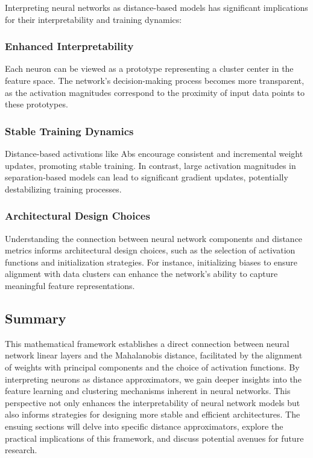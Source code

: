 Interpreting neural networks as distance-based models has significant implications for their interpretability and training dynamics:

\subsubsection{Enhanced Interpretability}

Each neuron can be viewed as a prototype representing a cluster center in the feature space. The network's decision-making process becomes more transparent, as the activation magnitudes correspond to the proximity of input data points to these prototypes.

\subsubsection{Stable Training Dynamics}

Distance-based activations like Abs encourage consistent and incremental weight updates, promoting stable training. In contrast, large activation magnitudes in separation-based models can lead to significant gradient updates, potentially destabilizing training processes.

\subsubsection{Architectural Design Choices}

Understanding the connection between neural network components and distance metrics informs architectural design choices, such as the selection of activation functions and initialization strategies. For instance, initializing biases to ensure alignment with data clusters can enhance the network's ability to capture meaningful feature representations.

\subsection{Summary}

This mathematical framework establishes a direct connection between neural network linear layers and the Mahalanobis distance, facilitated by the alignment of weights with principal components and the choice of activation functions. By interpreting neurons as distance approximators, we gain deeper insights into the feature learning and clustering mechanisms inherent in neural networks. This perspective not only enhances the interpretability of neural network models but also informs strategies for designing more stable and efficient architectures. The ensuing sections will delve into specific distance approximators, explore the practical implications of this framework, and discuss potential avenues for future research.
